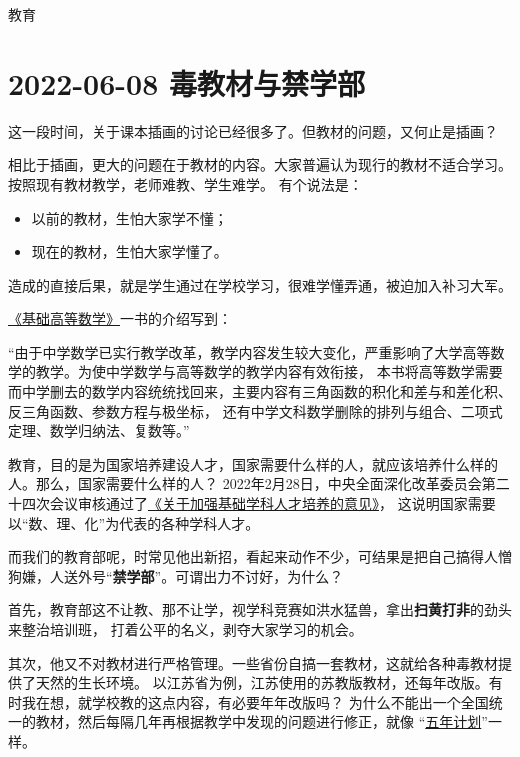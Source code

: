 \begin{taged}{教育}
\section{2022-06-08 毒教材与禁学部}
\end{taged}

这一段时间，关于课本插画的讨论已经很多了。但教材的问题，又何止是插画？

相比于插画，更大的问题在于教材的内容。大家普遍认为现行的教材不适合学习。按照现有教材教学，老师难教、学生难学。
有个说法是：
\begin{itemize}[nosep, left=\parindent]
    \item 以前的教材，生怕大家学不懂；
    \item 现在的教材，生怕大家学懂了。
\end{itemize}
造成的直接后果，就是学生通过在学校学习，很难学懂弄通，被迫加入补习大军。


\href{http://product.m.dangdang.com/detail29334931-0-1.html}{《基础高等数学》}一书的介绍写到：
\begin{yinyong}
“由于中学数学已实行教学改革，教学内容发生较大变化，严重影响了大学高等数学的教学。为使中学数学与高等数学的教学内容有效衔接，
本书将高等数学需要而中学删去的数学内容统统找回来，主要内容有三角函数的积化和差与和差化积、反三角函数、参数方程与极坐标，
还有中学文科数学删除的排列与组合、二项式定理、数学归纳法、复数等。”
\end{yinyong}


教育，目的是为国家培养建设人才，国家需要什么样的人，就应该培养什么样的人。那么，国家需要什么样的人？
2022年2月28日，中央全面深化改革委员会第二十四次会议审核通过了\href{http://www.gov.cn/xinwen/2022-02/28/content_5676110.htm}{《关于加强基础学科人才培养的意见》}，
这说明国家需要以“数、理、化”为代表的各种学科人才。


而我们的教育部呢，时常见他出新招，看起来动作不少，可结果是把自己搞得人憎狗嫌，人送外号“\textbf{禁学部}”。可谓出力不讨好，为什么？

首先，教育部这不让教、那不让学，视学科竞赛如洪水猛兽，拿出\textbf{扫黄打非}的劲头来整治培训班，
打着公平的名义，剥夺大家学习的机会。

其次，他又不对教材进行严格管理。一些省份自搞一套教材，这就给各种毒教材提供了天然的生长环境。
以江苏省为例，江苏使用的苏教版教材，还每年改版。有时我在想，就学校教的这点内容，有必要年年改版吗？
为什么不能出一个全国统一的教材，然后每隔几年再根据教学中发现的问题进行修正，就像
“\href{https://baike.baidu.com/item/%E4%BA%94%E5%B9%B4%E8%A7%84%E5%88%92/6544998}{五年计划}”一样。


